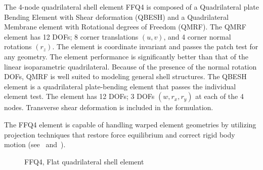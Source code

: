 The 4-node quadrilateral shell element FFQ4 is composed of a
Quadrilateral plate Bending Element with Shear deformation (QBESH)
and a Quadrilateral Membrane element with Rotational degrees of Freedom (QMRF).
The QMRF element has 12 DOFs; 8 corner translations $(u,v)$,
and 4 corner normal rotations $(r_z)$.
The element is coordinate invariant and passes the patch test for any geometry.
The element performance is significantly better than that of the
linear isoparametric quadrilateral.
Because of the presence of the normal rotation DOFs,
QMRF is well suited to modeling general shell structures.
The QBESH element is a quadrilateral plate-bending element that passes the
individual element test.
The element has 12 DOFs; 3 DOFs $(w,r_x,r_y)$ at each of the 4 nodes.
Transverse shear deformation is included in the formulation.

The FFQ4 element is capable of handling warped element geometries by utilizing
projection techniques that restore force equilibrium and correct rigid body
motion (see~\cite{RankinNourOmid} and~\cite{BH:phd}).

\begin{figure}[b]
\caption{FFQ4, Flat quadrilateral shell element}
\label{fig:FFQ4}
\end{figure}

